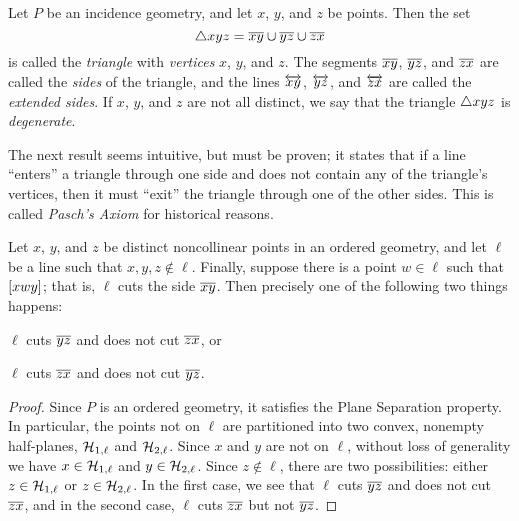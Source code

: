 \begin{dfn}[Triangle]
Let \(P\) be an incidence geometry, and let \(x\), \(y\), and \(z\) be points.
Then the set \[ \bigtriangleup{xyz} = \overline{xy} \cup \overline{yz} \cup \overline{zx} \] is called the \emph{triangle} with \emph{vertices} \(x\), \(y\), and \(z\).
The segments \(\overline{xy}\), \(\overline{yz}\), and \(\overline{zx}\) are called the \emph{sides} of the triangle, and the lines \(\overleftrightarrow{xy}\), \(\overleftrightarrow{yz}\), and \(\overleftrightarrow{zx}\) are called the \emph{extended sides}.
If \(x\), \(y\), and \(z\) are not all distinct, we say that the triangle \(\bigtriangleup{xyz}\) is \emph{degenerate}.
\end{dfn}

The next result seems intuitive, but must be proven; it states that if a line ``enters'' a triangle through one side and does not contain any of the triangle's vertices, then it must ``exit'' the triangle through one of the other sides.
This is called \emph{Pasch's Axiom} for historical reasons.

\begin{prop}
Let \(x\), \(y\), and \(z\) be distinct noncollinear points in an ordered geometry, and let \(\ell\) be a line such that \(x,y,z \notin \ell\).
Finally, suppose there is a point \(w \in \ell\) such that \([ x w y ]\); that is, \(\ell\) cuts the side \(\overline{xy}\).
Then precisely one of the following two things happens:
\begin{proplist}
\item \(\ell\) cuts \(\overline{yz}\) and does not cut \(\overline{zx}\), or
\item \(\ell\) cuts \(\overline{zx}\) and does not cut \(\overline{yz}\).
\end{proplist}
\end{prop}

\begin{proof}
Since \(P\) is an ordered geometry, it satisfies the Plane Separation property.
In particular, the points not on \(\ell\) are partitioned into two convex, nonempty half-planes, \(\mathcal{H}_{1,\ell}\) and \(\mathcal{H}_{2,\ell}\).
Since \(x\) and \(y\) are not on \(\ell\), without loss of generality we have \(x \in \mathcal{H}_{1,\ell}\) and \(y \in \mathcal{H}_{2,\ell}\).
Since \(z \notin \ell\), there are two possibilities: either \(z \in \mathcal{H}_{1,\ell}\) or \(z \in \mathcal{H}_{2,\ell}\).
In the first case, we see that \(\ell\) cuts \(\overline{yz}\) and does not cut \(\overline{zx}\), and in the second case, \(\ell\) cuts \(\overline{zx}\) but not \(\overline{yz}\).
\end{proof}

